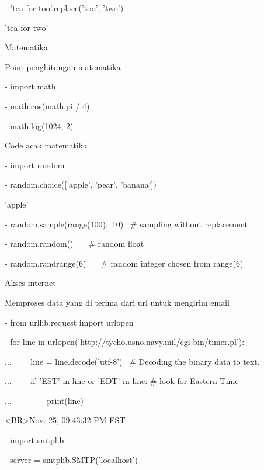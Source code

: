 - 'tea for too'.replace('too', 'two') \par
\noindent 
'tea for two' \par
\vspace{12pt}
\noindent 
Matematika  \par
\noindent 
Point penghitungan matematika \par
\noindent 
- import math \par
\noindent 
- math.cos(math.pi / 4) \par
{} \par
\noindent 
- math.log(1024, 2) \par
{} \par
\noindent 
Code acak matematika \par
\noindent 
- import random \par
\noindent 
- random.choice(['apple', 'pear', 'banana']) \par
\noindent 
'apple' \par
\noindent 
- random.sample(range(100),~10)~   $  \#  $ sampling without replacement \par
\noindent 
[30, 83, 16, 4, 8, 81, 41, 50, 18, 33] \par
\noindent 
- random.random()~~~  $  \#  $ random float \par
{} \par
\noindent 
- random.randrange(6)~~~  $  \#  $ random integer chosen from range(6) \par
{} \par
\noindent 
Akses internet \par
\noindent 
Memproses data yang di terima dari url untuk mengirim email \par
\noindent 
- from urllib.request import urlopen \par
\noindent 
- for line in urlopen('http://tycho.usno.navy.mil/cgi-bin/timer.pl'): \par
\noindent 
...~~~~ line = line.decode('utf-8')~  $  \#  $ Decoding the binary data to text. \par
\noindent 
...~~~~ if~'EST' in line or 'EDT' in line:   $  \#  $ look for Eastern Time \par
\noindent 
...~~~~~~~~ print(line) \par
\noindent 
<BR>Nov. 25, 09:43:32 PM EST \par
\noindent 
- import smtplib \par
\noindent 
- server = smtplib.SMTP('localhost') \par
